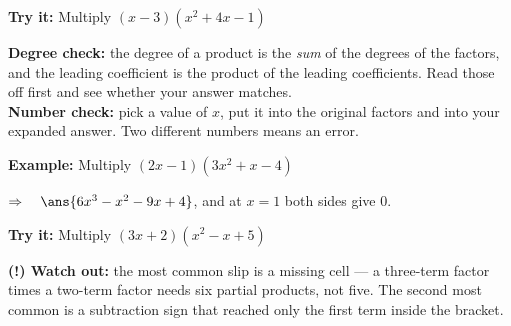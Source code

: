 \documentclass[12pt]{article}
\begin{document}
\begin{tryitbox}
\textbf{Try it:} \quad Multiply $(x - 3)(x^{2} + 4x - 1)$\\[2pt]
\end{tryitbox}


\begin{formulabox}
\textbf{Degree check:} the degree of a product is the \textit{sum} of the
degrees of the factors, and the leading coefficient is the product of the
leading coefficients. Read those off first and see whether your answer matches.\\[3pt]
\textbf{Number check:} pick a value of $x$, put it into the original factors and
into your expanded answer. Two different numbers means an error.
\end{formulabox}

\begin{examplebox}
\textbf{Example:} \quad Multiply $(2x - 1)(3x^{2} + x - 4)$

$\Rightarrow\quad \ans{6x^3 - x^2 - 9x + 4}$, and at $x = 1$ both sides give $0$.
\end{examplebox}

\begin{tryitbox}
\textbf{Try it:} \quad Multiply $(3x + 2)(x^{2} - x + 5)$\\[2pt]
\end{tryitbox}

\begin{watchoutbox}
\textbf{(!) Watch out:} the most common slip is a missing cell --- a three-term
factor times a two-term factor needs six partial products, not five. The second
most common is a subtraction sign that reached only the first term inside the
bracket.
\end{watchoutbox}
\end{document}
